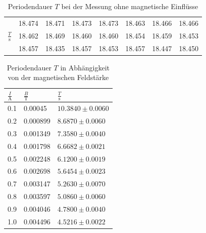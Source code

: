 \documentclass[11pt,ngerman,a4paper]{article}
\begin{document}
\newpage
\begin{table}[H]
\centering
\begin{tabular}{|c|lllllll|}
\hline
&18.474&18.471&18.473&18.473&18.463&18.466&18.466\\
$\frac{T}{\si{\second}}$ &18.462 & 18.469& 18.460&  18.460 & 18.454&18.459&18.453\\&18.457&18.435&18.457&18.453&18.457&18.447&18.450\\
\hline
\end{tabular}

\caption{Periodendauer $T$ bei der Messung ohne magnetische Einflüsse}
\end{table}
\begin{table}
\centering
\begin{tabular}{lll}
\toprule
{$\frac{I}{\si{\ampere}}$} &{ $\frac{B}{\si{\tesla}}$} &{ $\frac{T}{\si{\second}}$ }\\
\midrule
0.1 & 0.00045 & $10.3840 \pm 0.0060$ \\
0.2 & 0.000899 & $8.6870 \pm 0.0060$ \\
0.3 & 0.001349 & $7.3580 \pm 0.0040$ \\
0.4 & 0.001798 & $6.6682 \pm 0.0021$ \\
0.5 & 0.002248 & $6.1200 \pm 0.0019$ \\
0.6 & 0.002698 & $5.6454 \pm 0.0023$ \\
0.7 & 0.003147 & $5.2630 \pm 0.0070$ \\
0.8 & 0.003597 & $5.0860 \pm 0.0060$ \\
0.9 & 0.004046 & $4.7800 \pm 0.0040$ \\
1.0 & 0.004496 & $4.5216 \pm 0.0022$ \\
\bottomrule
\end{tabular}
\label{}
\caption{Periodendauer $T$ in Abhängigkeit von der magnetischen Feldstärke}
\end{table}
\end{document}
